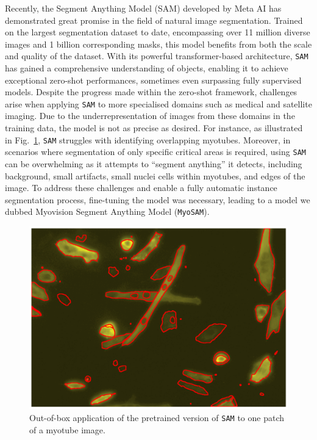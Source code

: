 Recently, the Segment Anything Model (SAM) \cite{kirillov2023segment} developed by Meta AI has demonstrated great promise in the field of natural image segmentation. Trained on the largest segmentation dataset to date, encompassing over 11 million diverse images and 1 billion corresponding masks, this model benefits from both the scale and quality of the dataset. With its powerful transformer-based architecture, \texttt{SAM} has gained a comprehensive understanding of objects, enabling it to achieve exceptional zero-shot performances, sometimes even surpassing fully supervised models.
Despite the progress made within the zero-shot framework, challenges arise when applying \texttt{SAM} to more specialised domains such as medical and satellite imaging. Due to the underrepresentation of images from these domains in the training data, the model is not as precise as desired. For instance, as illustrated in Fig.~\ref{figzeroshot}, \texttt{SAM} struggles with identifying overlapping myotubes. Moreover, in scenarios where segmentation of only specific critical areas is required, using \texttt{SAM} can be overwhelming as it attempts to “segment anything” it detects, including background, small artifacts, small nuclei cells within myotubes, and edges of the image. To address these challenges and enable a fully automatic instance segmentation process, fine-tuning the model was necessary, leading to a model we dubbed Myovision Segment Anything Model (\texttt{MyoSAM}).

\begin{figure}
	\centering
	\includegraphics[width=\textwidth]{"images/sam_zeroshot.png"}
	\caption[\texttt{SAM} zeroshot]{Out-of-box application of the pretrained version of \texttt{SAM} to one patch of a myotube image.}
	\label{figzeroshot}
\end{figure}
